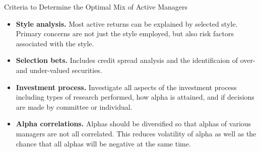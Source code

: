 \documentclass[../custom]{flashcards}
\begin{document}
\begin{flashcard}{Criteria to Determine the Optimal Mix of Active Managers}
    \begin{itemize}
        \item \textbf{Style analysis.} Most active returns can be explained by selected style. Primary concerns are not just the style employed, but also risk factors associated with the style.
        \item \textbf{Selection bets.} Includes credit spread analysis and the identificaion of over- and under-valued securities.
        \item \textbf{Investment process.} Investigate all aspects of the investment process including types of research performed, how alpha is attained, and if decisions are made by committee or individual.
        \item \textbf{Alpha correlations.} Alphas should be diversified so that alphas of various managers are not all correlated. This reduces volatility of alpha as well as the chance that all alphas will be negative at the same time.
    \end{itemize}
\end{flashcard}
\end{document}
